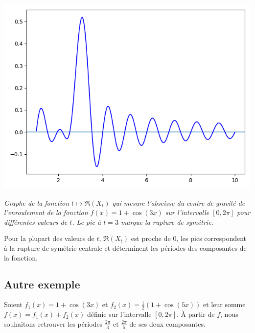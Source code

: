 \documentclass[11pt,class=report,crop=false]{standalone}
\begin{document}
\begin{center}
\includegraphics[scale=\myscale,scale=0.5]{figures/fourier-7}

\nopagebreak

\begin{minipage}{0.8\textwidth}
\center\emph{Graphe de la fonction $t \mapsto \Re(X_t)$ qui mesure l'abscisse du centre de gravité de l'enroulement de la fonction $f(x) = 1+\cos(3x)$ sur l'intervalle $[0,2\pi]$ pour différentes valeurs de $t$. Le pic à $t=3$ marque la rupture de symétrie.
}
\end{minipage}
\end{center}


Pour la plupart des valeurs de $t$, $\Re(X_t)$ est proche de $0$, les pics correspondent à la rupture de symétrie centrale et déterminent les périodes des composantes de la fonction.

\subsection{Autre exemple}

Soient $f_1(x) = 1 + \cos(3x)$ et $f_2(x) = \frac12(1+\cos(5x))$ et leur somme $f(x) = f_1(x) + f_2(x)$ définie sur l'intervalle $[0,2\pi]$. \`A partir de $f$, nous souhaitons retrouver les périodes $\frac{2\pi}{3}$ et $\frac{2\pi}{5}$ de ses deux composantes.
\end{document}
